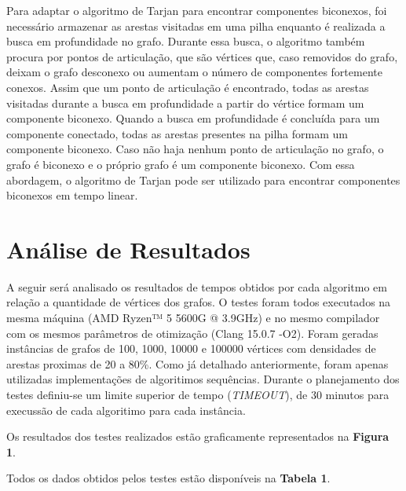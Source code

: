 Para adaptar o algoritmo de Tarjan para encontrar componentes biconexos, foi necessário armazenar as arestas visitadas em uma pilha enquanto é realizada a busca em profundidade no grafo. Durante essa busca, o algoritmo também procura por pontos de articulação, que são vértices que, caso removidos do grafo, deixam o grafo desconexo ou aumentam o número de componentes fortemente conexos. Assim que um ponto de articulação é encontrado, todas as arestas visitadas durante a busca em profundidade a partir do vértice formam um componente biconexo. Quando a busca em profundidade é concluída para um componente conectado, todas as arestas presentes na pilha formam um componente biconexo. Caso não haja nenhum ponto de articulação no grafo, o grafo é biconexo e o próprio grafo é um componente biconexo. Com essa abordagem, o algoritmo de Tarjan pode ser utilizado para encontrar componentes biconexos em tempo linear.


\section{\esp Análise de Resultados}

A seguir será analisado os resultados de tempos obtidos por cada algoritmo em relação
a quantidade de vértices dos grafos. O testes foram todos executados na mesma máquina (AMD Ryzen™ 5 5600G @ 3.9GHz) e no mesmo compilador com os mesmos parâmetros de otimização (Clang 15.0.7 -O2). 
Foram geradas instâncias de grafos de 100, 1000, 10000 e 100000 vértices com densidades de arestas proximas de 20 a 80\%. Como já detalhado anteriormente, foram apenas utilizadas implementações de algoritimos sequências. Durante o planejamento dos testes definiu-se um limite superior de tempo (\textit{TIMEOUT}), de 30 minutos para execussão de cada algoritimo para cada instância.

Os resultados dos testes realizados estão graficamente representados na \textbf{Figura 1}.

Todos os dados obtidos pelos testes estão disponíveis na \textbf{Tabela 1}.

